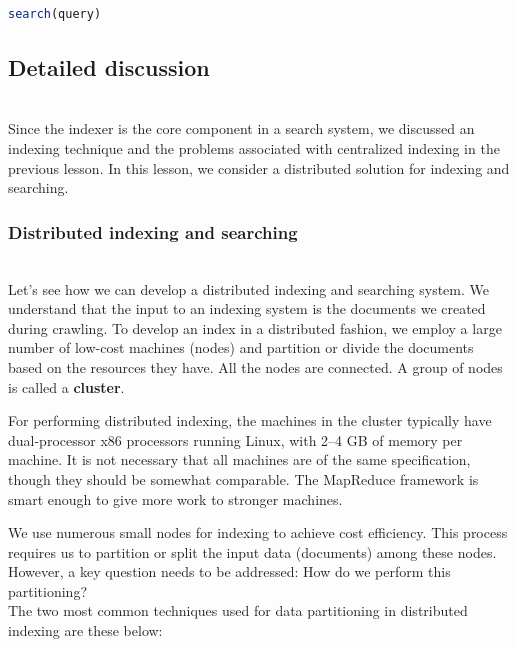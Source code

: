 \begin{lstlisting}[language=JavaScript]
search(query)
\end{lstlisting}

\begin{table}[htbp]
\centering
\small
{}
\end{table}

\subsection{Detailed discussion}\label{5xmh8aqJCMT4qxBX3J-04}
\\
Since the indexer is the core component in a search system, we discussed an indexing technique and the problems associated with centralized indexing in the previous lesson. In this lesson, we consider a distributed solution for indexing and searching.

\subsubsection{Distributed indexing and searching}\label{okn0At-fcFYWNQ3PpK9T3}
\\
Let's see how we can develop a distributed indexing and searching system. We understand that the input to an indexing system is the documents we created during crawling. To develop an index in a distributed fashion, we employ a large number of low-cost machines (nodes) and partition or divide the documents based on the resources they have. All the nodes are connected. A group of nodes is called a \textbf{cluster}.

For performing distributed indexing, the machines in the cluster typically have dual-processor x86 processors running Linux, with 2--4 GB of memory per machine. It is not necessary that all machines are of the same specification, though they should be somewhat comparable. The MapReduce framework is smart enough to give more work to stronger machines.

We use numerous small nodes for indexing to achieve cost efficiency. This process requires us to partition or split the input data (documents) among these nodes. However, a key question needs to be addressed: How do we perform this partitioning?
\\
The two most common techniques used for data partitioning in distributed indexing are these below:

